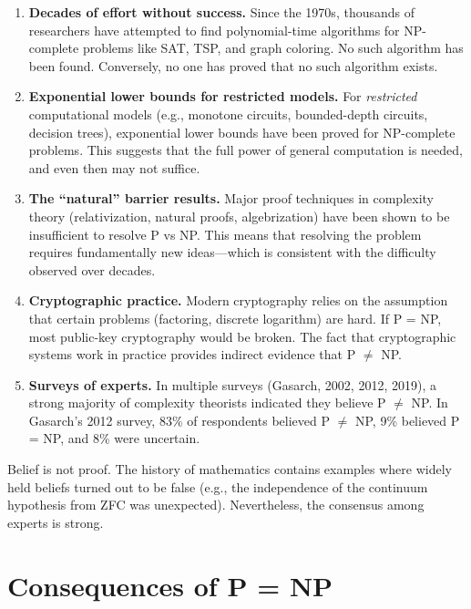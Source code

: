 \begin{enumerate}
  \item \textbf{Decades of effort without success.} Since the 1970s, thousands of researchers have attempted to find polynomial-time algorithms for NP-complete problems like SAT, TSP, and graph coloring. No such algorithm has been found. Conversely, no one has proved that no such algorithm exists.

  \item \textbf{Exponential lower bounds for restricted models.} For \emph{restricted} computational models (e.g., monotone circuits, bounded-depth circuits, decision trees), exponential lower bounds have been proved for NP-complete problems. This suggests that the full power of general computation is needed, and even then may not suffice.

  \item \textbf{The ``natural'' barrier results.} Major proof techniques in complexity theory (relativization, natural proofs, algebrization) have been shown to be insufficient to resolve P vs NP. This means that resolving the problem requires fundamentally new ideas---which is consistent with the difficulty observed over decades.

  \item \textbf{Cryptographic practice.} Modern cryptography relies on the assumption that certain problems (factoring, discrete logarithm) are hard. If P = NP, most public-key cryptography would be broken. The fact that cryptographic systems work in practice provides indirect evidence that P $\neq$ NP.

  \item \textbf{Surveys of experts.} In multiple surveys (Gasarch, 2002, 2012, 2019), a strong majority of complexity theorists indicated they believe P $\neq$ NP. In Gasarch's 2012 survey, 83\% of respondents believed P $\neq$ NP, 9\% believed P = NP, and 8\% were uncertain.
\end{enumerate}

\begin{remark}
Belief is not proof. The history of mathematics contains examples where widely held beliefs turned out to be false (e.g., the independence of the continuum hypothesis from ZFC was unexpected). Nevertheless, the consensus among experts is strong.
\end{remark}

\section{Consequences of P = NP}

